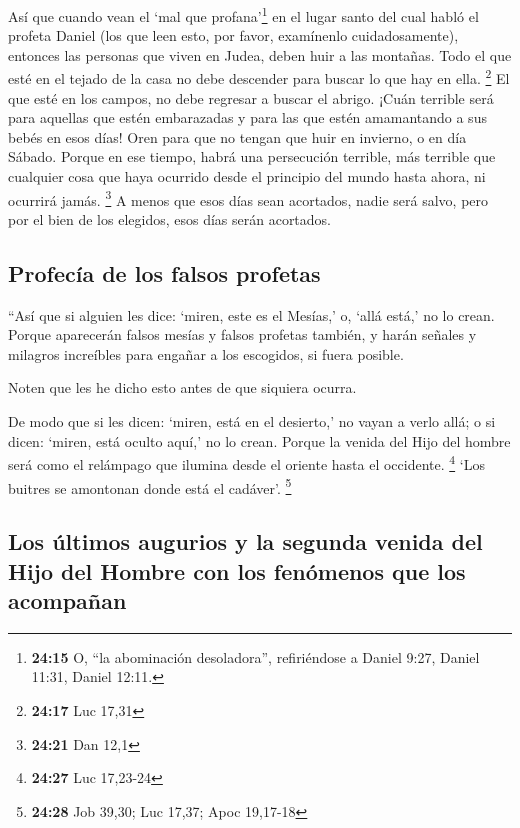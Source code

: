  Así que cuando vean el `mal que profana'\footnote{\textbf{24:15}
  O, ``la abominación desoladora'', refiriéndose a Daniel 9:27, Daniel
  11:31, Daniel 12:11.} en el lugar santo del cual habló el profeta
Daniel (los que leen esto, por favor, examínenlo cuidadosamente),
 entonces las personas que viven en Judea, deben huir a
las montañas.  Todo el que esté en el tejado de la casa
no debe descender para buscar lo que hay en ella. \footnote{\textbf{24:17}
  Luc 17,31}  El que esté en los campos, no debe regresar
a buscar el abrigo.  ¡Cuán terrible será para aquellas
que estén embarazadas y para las que estén amamantando a sus bebés en
esos días!  Oren para que no tengan que huir en invierno,
o en día Sábado.  Porque en ese tiempo, habrá una
persecución terrible, más terrible que cualquier cosa que haya ocurrido
desde el principio del mundo hasta ahora, ni ocurrirá jamás. \footnote{\textbf{24:21}
  Dan 12,1}  A menos que esos días sean acortados, nadie
será salvo, pero por el bien de los elegidos, esos días serán acortados.

\hypertarget{profecuxeda-de-los-falsos-profetas}{%
\subsection{Profecía de los falsos
profetas}\label{profecuxeda-de-los-falsos-profetas}}

 ``Así que si alguien les dice: `miren, este es el
Mesías,' o, `allá está,' no lo crean.  Porque aparecerán
falsos mesías y falsos profetas también, y harán señales y milagros
increíbles para engañar a los escogidos, si fuera posible.

 Noten que les he dicho esto antes de que siquiera
ocurra.

 De modo que si les dicen: `miren, está en el desierto,'
no vayan a verlo allá; o si dicen: `miren, está oculto aquí,' no lo
crean.  Porque la venida del Hijo del hombre será como el
relámpago que ilumina desde el oriente hasta el occidente. \footnote{\textbf{24:27}
  Luc 17,23-24}  `Los buitres se amontonan donde está el
cadáver'. \footnote{\textbf{24:28} Job 39,30; Luc 17,37; Apoc 19,17-18}

\hypertarget{los-uxfaltimos-augurios-y-la-segunda-venida-del-hijo-del-hombre-con-los-fenuxf3menos-que-los-acompauxf1an}{%
\subsection{Los últimos augurios y la segunda venida del Hijo del Hombre
con los fenómenos que los
acompañan}\label{los-uxfaltimos-augurios-y-la-segunda-venida-del-hijo-del-hombre-con-los-fenuxf3menos-que-los-acompauxf1an}}

